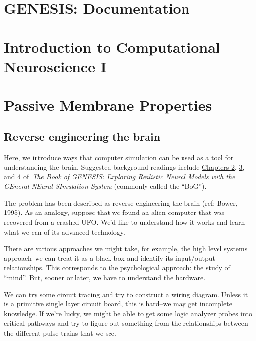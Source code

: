 \documentclass[12pt]{article}
\begin{document}
\section*{GENESIS: Documentation}

\section*{Introduction to Computational Neuroscience I}

\section*{Passive Membrane Properties}

\subsection*{Reverse engineering the brain}

Here, we introduce ways that computer simulation can be used as a tool for understanding the brain. Suggested background readings include \href{../bog-ch2/bog-ch2.pdf}{Chapters 2}, \href{../bog-ch3/bog-ch3.pdf}{3}, and \href{../bog-ch4/bog-ch4.pdf}{4} of {\it\,The Book of GENESIS: Exploring Realistic Neural Models with the GEneral NEural SImulation System} (commonly called the ``BoG''). 

The problem has been described as reverse engineering the brain (ref: Bower, 1995). As an analogy, suppose that we found an alien computer that was recovered from a crashed UFO. We'd like to understand how it works and learn what we can of its advanced technology.

There are various approaches we might take, for example, the high level systems approach--we can treat it as a black box and identify its input/output relationships. This corresponds to the psychological approach: the study of ``mind''. But, sooner or later, we have to understand the hardware.

We can try some circuit tracing and try to construct a wiring diagram. Unless it is a primitive single layer circuit board, this is hard--we may get incomplete knowledge. If we're lucky, we might be able to get some logic analyzer probes into critical pathways and try to figure out something from the relationships between the different pulse trains that we see.
\end{document}
